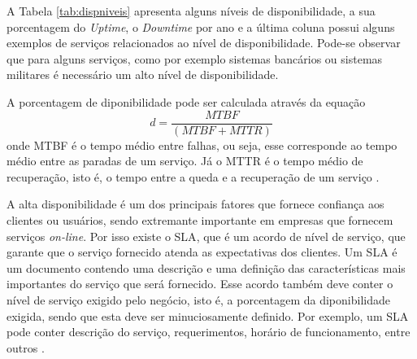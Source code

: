 A Tabela \ref{tab:dispniveis} apresenta alguns níveis de disponibilidade, a sua porcentagem do \textit{Uptime}, o \textit{Downtime} por ano 
e a última coluna possui alguns exemplos de serviços relacionados ao nível de disponibilidade. Pode-se observar que para alguns serviços, 
como por exemplo sistemas bancários ou sistemas militares é necessário um alto nível de disponibilidade.

A porcentagem de diponibilidade pode ser calculada através da equação
\begin{equation}
d = \frac{MTBF}{(MTBF + MTTR)}
\label{diponibilidade}
\end{equation}
onde \ac{MTBF} é o tempo médio entre falhas, ou seja, esse corresponde ao tempo médio entre as paradas de um serviço. Já o \ac{MTTR} é o 
tempo médio de recuperação, isto é, o tempo entre a queda e a recuperação de um serviço \cite{goncalves2009}.

A alta disponibilidade é um dos principais fatores que fornece confiança aos clientes ou usuários, sendo extremante importante 
em empresas que fornecem serviços \textit{on-line}. Por isso existe o \ac{SLA}, que é um acordo de nível de serviço, que garante que 
o serviço fornecido atenda as expectativas dos clientes. Um \ac{SLA} é um documento contendo uma descrição e uma definição das 
características mais importantes do serviço que será fornecido. Esse acordo também deve conter o nível de serviço exigido pelo negócio, 
isto é, a porcentagem da diponibilidade exigida, sendo que esta deve ser minuciosamente definido. Por exemplo, um \ac{SLA} pode conter 
descrição do serviço, requerimentos, horário de funcionamento, entre outros \cite{smith2010}.
